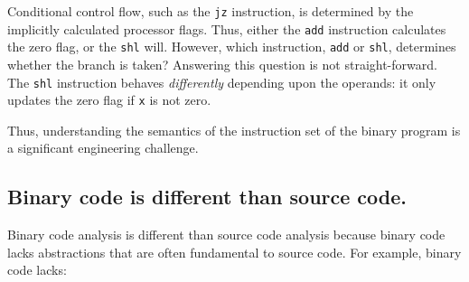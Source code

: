 Conditional control flow, such as the {\tt jz} instruction, is
determined by the implicitly calculated processor flags. Thus, either
the {\tt add} instruction calculates the zero flag, or the {\tt shl}
will.  However, which instruction, {\tt add} or {\tt shl}, determines
whether the branch is taken? Answering this question is not
straight-forward.  The {\tt shl} instruction behaves
\emph{differently} depending upon the operands: it only updates the
zero flag if {\tt x} is not zero.  

Thus, understanding the semantics of the instruction set of the binary
program is a significant engineering challenge.


\subsection{Binary code is different than source code.} Binary code
analysis is different than source code analysis because binary code
lacks abstractions that are often fundamental to source code.  For
example, binary code lacks:
